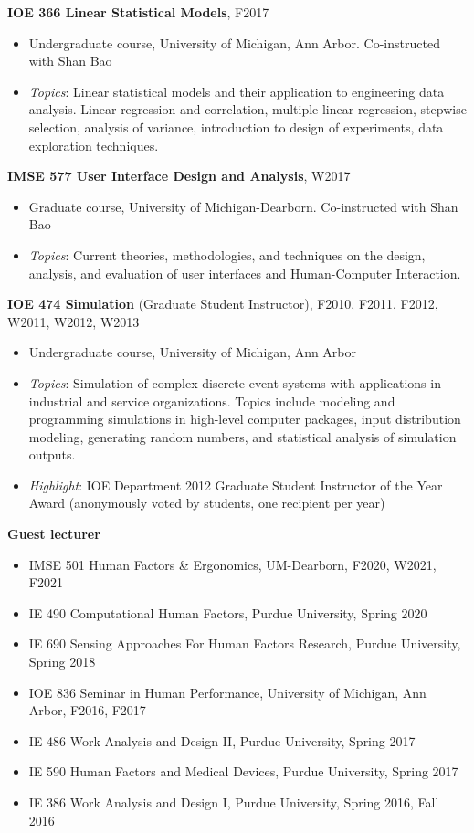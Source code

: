 \documentclass[11pt]{article}
\newenvironment{main}
{\begin{adjustwidth}{3em}{}}
{\end{adjustwidth}}
\begin{document}
\begin{main}
\textbf{IOE 366 Linear Statistical Models}, F2017

\begin{itemize}
    \item[] Undergraduate course, University of Michigan, Ann Arbor. Co-instructed with Shan Bao
    \item[] \textit{Topics}: Linear statistical models and their application to engineering data analysis. Linear regression and correlation, multiple linear regression, stepwise selection, analysis of variance, introduction to design of experiments, data exploration techniques.
\end{itemize}


\textbf{IMSE 577 User Interface Design and Analysis}, W2017

\begin{itemize}
    \item[] Graduate course, University of Michigan-Dearborn. Co-instructed with Shan Bao
    \item[] \textit{Topics}: Current theories, methodologies, and techniques on the design, analysis, and evaluation of user interfaces and Human-Computer Interaction. 
\end{itemize}


\textbf{IOE 474 Simulation} (Graduate Student Instructor), F2010, F2011, F2012, W2011, W2012, W2013

\begin{itemize}
    \item[] Undergraduate course, University of Michigan, Ann Arbor
    \item[] \textit{Topics}: Simulation of complex discrete-event systems with applications in industrial and service organizations. Topics include modeling and programming simulations in high-level computer packages, input distribution modeling, generating random numbers, and statistical analysis of simulation outputs.
    \item[] \textit{Highlight}: IOE Department 2012 Graduate Student Instructor of the Year Award (anonymously voted by students, one recipient per year)
\end{itemize}

\textbf{Guest lecturer}

\begin{itemize}
    \item IMSE 501 Human Factors \& Ergonomics, UM-Dearborn, F2020, W2021, F2021
    \item IE 490 Computational Human Factors, Purdue University, Spring 2020
    \item IE 690 Sensing Approaches For Human Factors Research, Purdue University, Spring 2018
    \item IOE 836 Seminar in Human Performance, University of Michigan, Ann Arbor, F2016, F2017
    \item IE 486 Work Analysis and Design II, Purdue University, Spring 2017
    \item IE 590 Human Factors and Medical Devices, Purdue University, Spring 2017
    \item IE 386 Work Analysis and Design I, Purdue University, Spring 2016, Fall 2016
\end{itemize}



\end{main}
\end{document}
